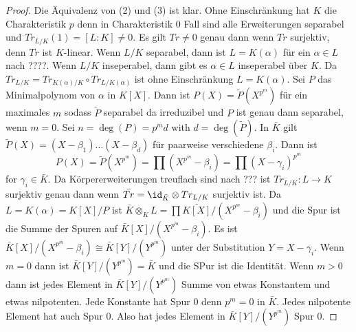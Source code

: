 \begin{proof}
	Die Äquivalenz von (2) und (3) ist klar.
	Ohne Einschränkung hat \(K\) die Charakteristik \(p\) denn in Charakteristik \(0\) Fall sind alle
	Erweiterungen separabel und \(Tr_{L/K}(1)=[L:K]\neq 0\).
	Es gilt \(Tr\neq 0\) genau dann wenn \(Tr\) surjektiv, denn \(Tr\) ist \(K\)-linear.
	Wenn \(L/K\) separabel, dann ist \(L=K(\alpha)\) für ein \(\alpha\in L\) nach ????.
	Wenn \(L/K\) inseperabel, dann gibt es \(\alpha\in L\) inseperabel über \(K\).
	Da \(Tr_{L/K}=Tr_{K(\alpha)/K}\circ Tr_{L/K(\alpha)}\) ist ohne Einschränkung \(L=K(\alpha)\).
	Sei \(P\) das Minimalpolynom von \(\alpha\) in \(K[X]\).
	Dann ist \(P(X)=\tilde P(X^{p^m})\) für ein maximales \(m\) sodass \(\tilde P\) separabel da irreduzibel und 
	\(P\) ist genau dann separabel, wenn \(m=0\).
	Sei \(n=\deg(P)=p^md\) with \(d=\deg(\tilde P)\).
	In \(\bar K\) gilt \(\tilde P(X)=(X-\beta_1)\dots (X-\beta_d)\) für paarweise verschiedene 
	\(\beta_i\). 
	Dann ist 
	\[P(X)=\tilde P(X^{p^m})=\prod (X^{p^m}-\beta_i)=\prod (X-\gamma_i)^{p^m}\]
	for \(\gamma_i\in\bar K\).
	Da Körpererweiterungen treuflach sind nach ??? ist \(Tr_{L/K}\colon L\to K\) surjektiv genau dann wenn 
	\(\bar{Tr}=\id_{\bar K}\otimes Tr_{L/K}\) surjektiv ist.
	Da \(L=K(\alpha)=K[X]/P\) ist \(\bar K\otimes_KL=\prod \bar{K[X]}/(X^{p^m}-\beta_i)\) und die Spur ist die Summe
	der Spuren auf \(\bar K[X]/(X^{p^m}-\beta_i)\).
	Es ist \(\bar K[X]/(X^{p^m}-\beta_i)\cong \bar K[Y]/(Y^{p^m})\) unter der Substitution
	\(Y=X-\gamma_i\).
	Wenn \(m=0\) dann ist \(\bar K[Y]/(Y^{p^m})=\bar K\) und die SPur ist die Identität.
	Wenn \(m>0\) dann ist jedes Element in \(\bar K[Y]/(Y^{p^m})\) Summe von etwas Konstantem und etwas nilpotenten.
	Jede Konstante hat Spur \(0\) denn \(p^m=0\) in \(\bar K\).
	Jedes nilpotente Element hat auch Spur \(0\). Also hat jedes Element in \(\bar K[Y]/(Y^{p^m})\) Spur \(0\).
\end{proof}